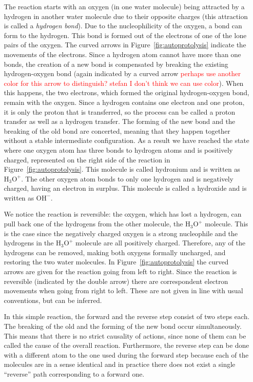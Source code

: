 \documentclass[runningheads]{llncs}
\newcommand\anna[1]{\textcolor{red}{#1}}
\begin{document}
The reaction
starts with an oxygen (in one water molecule) being attracted by a hydrogen in another 
water molecule due to their opposite
charges (this attraction is called a \emph{hydrogen bond}). Due to the nucleophilicity of 
the oxygen, a bond can form to the hydrogen. This bond is formed out of 
the electrons of one of the lone pairs of the oxygen. The curved arrows in Figure~\ref{fig:autoprotolysis} indicate the movements of the electrons. Since a hydrogen atom cannot have more 
than one bonds, 
the creation of a new bond is compensated by breaking the existing hydrogen-oxygen bond (again indicated by a curved arrow
\anna{perhaps use another color for this arrow to distinguish? stefan I don't think we can use color}). When this happens, the two electrons, which formed the original hydrogen-oxygen bond, remain with the oxygen. Since a hydrogen contains %
one electron and one proton, it is only the proton that is transferred, so the process can be called a proton transfer as well as a hydrogen transfer. The forming of the new bond and the breaking of the old bond are concerted, meaning that %
they happen together without a stable 
intermediate configuration. As a result we have reached the state where one oxygen atom
has three bonds to hydrogen atoms and is positively charged, represented on the right side of the reaction in %
 Figure~\ref{fig:autoprotolysis}. This molecule is called hydronium and is written as $\mathrm{H_3O^+}$. The other oxygen atom bonds to only one hydrogen and is negatively charged, having an 
electron in surplus. This molecule is called a hydroxide and is written as $\mathrm{OH^-}$. 

We notice the reaction is reversible: the oxygen, which has lost a hydrogen, can 
pull back one of the hydrogens from the other molecule, the  $\mathrm{H_3O^+}$ molecule. This is the case since the negatively 
charged oxygen is a strong nucleophile and the hydrogens in the $\mathrm{H_3O^+}$ molecule are 
all positively charged. Therefore, any of the hydrogens 
can be removed, making both oxygens formally uncharged, and restoring the two water 
molecules. In Figure~\ref{fig:autoprotolysis} the curved arrows are given for the reaction going from left to right. Since the reaction is reversible (indicated by the double arrow) there are correspondent electron movements when going from right to left. These are not given in line with usual conventions, but can be inferred.

In this simple reaction, the forward and the reverse step consist of two steps each. The breaking of the old and the forming of the new bond occur simultaneously. This means that there is no strict causality of actions, since none of them can be called the cause of the overall reaction. Furthermore, the reverse step can be done with a different atom to the one used during the forward step because each of the molecules are in a sense identical and in practice there does not exist a single ``reverse'' path corresponding to a forward one.%
\end{document}
